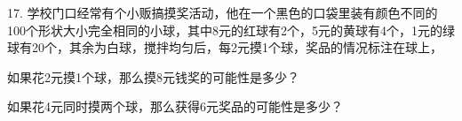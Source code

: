 17.	学校门口经常有个小贩搞摸奖活动，他在一个黑色的口袋里装有颜色不同的100个形状大小完全相同的小球，其中8元的红球有2个，5元的黄球有4个，1元的绿球有20个，其余为白球，搅拌均匀后，每2元摸1个球，奖品的情况标注在球上，

\begin{subquestions}

    \subquestion 如果花2元摸1个球，那么摸8元钱奖的可能性是多少？

    \subquestion 如果花4元同时摸两个球，那么获得6元奖品的可能性是多少？

\end{subquestions}





